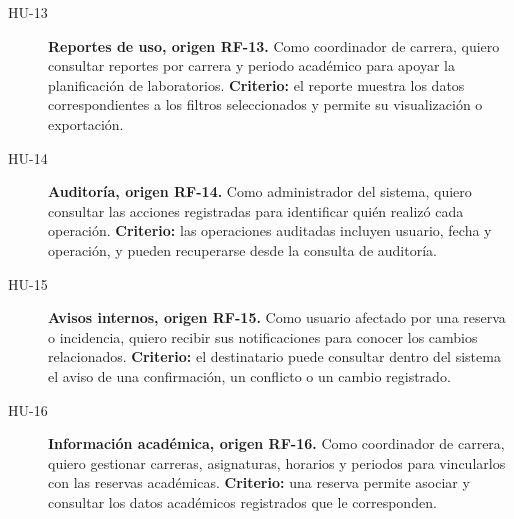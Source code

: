 {\begin{description}
    \item[HU-13] \textbf{Reportes de uso, origen RF-13.}
    Como coordinador de carrera, quiero consultar reportes por carrera y
    periodo académico para apoyar la planificación de laboratorios.
    \textbf{Criterio:} el reporte muestra los datos correspondientes a los
    filtros seleccionados y permite su visualización o exportación.

    \item[HU-14] \textbf{Auditoría, origen RF-14.}
    Como administrador del sistema, quiero consultar las acciones registradas
    para identificar quién realizó cada operación.
    \textbf{Criterio:} las operaciones auditadas incluyen usuario, fecha y
    operación, y pueden recuperarse desde la consulta de auditoría.

    \item[HU-15] \textbf{Avisos internos, origen RF-15.}
    Como usuario afectado por una reserva o incidencia, quiero recibir sus
    notificaciones para conocer los cambios relacionados.
    \textbf{Criterio:} el destinatario puede consultar dentro del sistema
    el aviso de una confirmación, un conflicto o un cambio registrado.

    \item[HU-16] \textbf{Información académica, origen RF-16.}
    Como coordinador de carrera, quiero gestionar carreras, asignaturas,
    horarios y periodos para vincularlos con las reservas académicas.
    \textbf{Criterio:} una reserva permite asociar y consultar los datos
    académicos registrados que le corresponden.
  \end{description}
}


